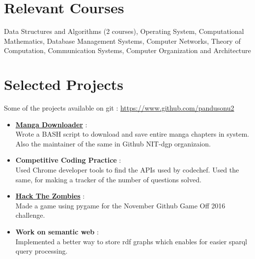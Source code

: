 \documentclass[margin, centered]{res}
\begin{document}
\begin{resume}
\section{Relevant \hspace{2mm} Courses}
Data Structures and Algorithms (2 courses), Operating System, Computational Mathematics, Database Management Systems, Computer Networks, Theory of Computation, Communication Systems, Computer Organization and Architecture

\section{Selected Projects}
Some of the projects available on git : \url{https://www.github.com/pandusonu2}
\begin{itemize}[leftmargin=*]
 \item \textbf{\href{https://github.com/NIT-dgp/manga}{Manga Downloader}} :\\
 Wrote a BASH script to download and save entire manga chapters in system. Also the maintainer of the same in Github NIT-dgp organizaion.
 \item \textbf{Competitive Coding Practice} :\\
 Used Chrome developer tools to find the APIs used by codechef. Used the same, for making a tracker of the number of questions solved.
 \item \textbf{\href{https://github.com/pandusonu2/game-off-2016}{Hack The Zombies}} :\\
 Made a game using pygame for the November Github Game Off 2016 challenge.
 \item \textbf{Work on semantic web} :\\
 Implemented a better way to store rdf graphs which enables for easier sparql query processing.
\end{itemize}



\end{resume}
\end{document}
